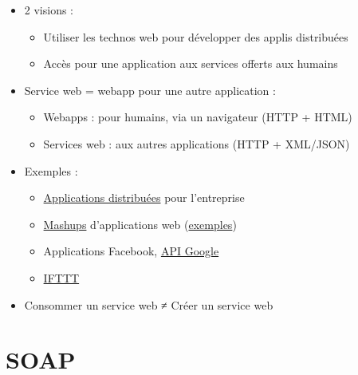 \begin{itemize}
\tightlist
\item
  2 visions :

  \begin{itemize}
  \tightlist
  \item
    Utiliser les technos web pour développer des applis distribuées
  \item
    Accès pour une application aux services offerts aux humains
  \end{itemize}
\item
  Service web = webapp pour une autre application :

  \begin{itemize}
  \tightlist
  \item
    Webapps : pour humains, via un navigateur (HTTP + HTML)
  \item
    Services web : aux autres applications (HTTP + XML/JSON)
  \end{itemize}
\item
  Exemples :

  \begin{itemize}
  \tightlist
  \item
    \href{https://upload.wikimedia.org/wikipedia/commons/3/3f/Concept_WS.jpg}{Applications
    distribuées} pour l'entreprise
  \item
    \href{https://fr.wikipedia.org/wiki/Application_composite}{Mashups}
    d'applications web
    (\href{https://www.programmableweb.com/category/mashups}{exemples})
  \item
    Applications Facebook,
    \href{https://developers.google.com/apis-explorer/}{API Google}
  \item
    \href{https://ifttt.com/}{IFTTT}
  \end{itemize}
\item
  Consommer un service web ≠ Créer un service web
\end{itemize}

\hypertarget{soap}{%
\section{SOAP}\label{soap}}

